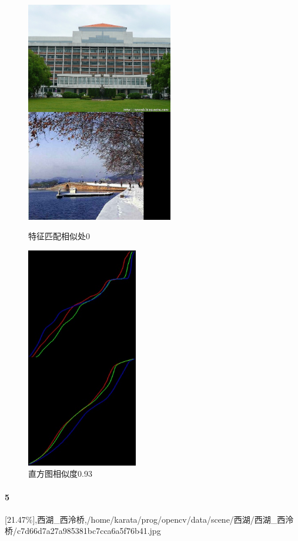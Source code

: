 \begin{figure}[htb]
\begin{minipage}[t]{0.5\linewidth}
\centering
\includegraphics[height=3.8in]{玉泉图书馆.jpg.d/im4sift.jpg}
\caption{特征匹配相似处0}
\label{fig:side:a}
\end{minipage}%
\begin{minipage}[t]{0.5\linewidth}
\centering
\includegraphics[height=3.8in]{玉泉图书馆.jpg.d/im4hist2.jpg}
\caption{直方图相似度0.93}
\label{fig:side:a}
\end{minipage}%
\end{figure}

\paragraph{5}
[21.47\%],西湖\_西泠桥,/home/karata/prog/opencv/data/scene/西湖/西湖\_西泠桥/c7d66d7a27a985381bc7cca6a5f76b41.jpg

